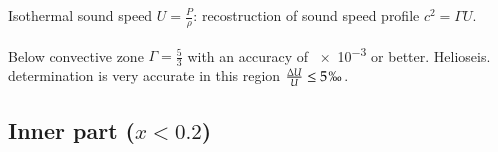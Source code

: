\documentclass[oneside,12pt]{memoir}
\begin{document}
Isothermal sound speed $U=\frac{P}{\rho}$: recostruction of sound speed profile $c^2=\Gamma U$.

Below convective zone $\Gamma=\frac{5}{3}$ with an accuracy of \num{e-3} or better. Helioseis. determination is very accurate in this region $\frac{\Delta U}{U}\leq5 \perthousand$.

\subsection{Inner part ($x<0.2$)}



\backmatter

\printbibliography
\end{document}
